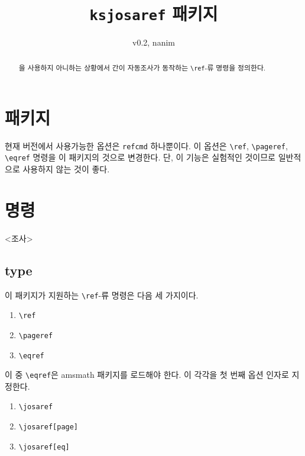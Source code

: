 \documentclass[polyglossia,a4paper,12pt,kosection]{oblivoir}
\def\pkg#1{\textsf{#1}}
\begin{document}
\pagestyle{hangul}

\title{\texttt{ksjosaref} 패키지}
\author{v0.2, nanim}
\maketitle

\begin{abstract}
\koTeX 을 사용하지 아니하는 상황에서 간이 자동조사가 동작하는 \verb|\ref|-류 명령을 정의한다.
\end{abstract}

\section{패키지}

\begin{code}
\usepackage[<options>]{ksjosaref}
\end{code}

현재 버전에서 사용가능한 옵션은 \verb|refcmd| 하나뿐이다. 이 옵션은 \verb|\ref|, \verb|\pageref|, \verb|\eqref| 명령을 이 패키지의 것으로 변경한다. 단, 이 기능은 실험적인 것이므로 일반적으로 사용하지 않는 것이 좋다.

\section{명령}

\begin{code}
<조사>
\end{code}

\subsection{type}
이 패키지가 지원하는 \verb|\ref|-류 명령은 다음 세 가지이다.
\begin{enumerate}\tightlist
\item \verb|\ref|
\item \verb|\pageref|
\item \verb|\eqref|
\end{enumerate}
이 중 \verb|\eqref|은 \pkg{amsmath} 패키지를 로드해야 한다. 이 각각을 첫 번째 옵션 인자로 지정한다.
\begin{enumerate}\tightlist
\item \verb|\josaref|
\item \verb|\josaref[page]|
\item \verb|\josaref[eq]|
\end{enumerate}
\end{document}
